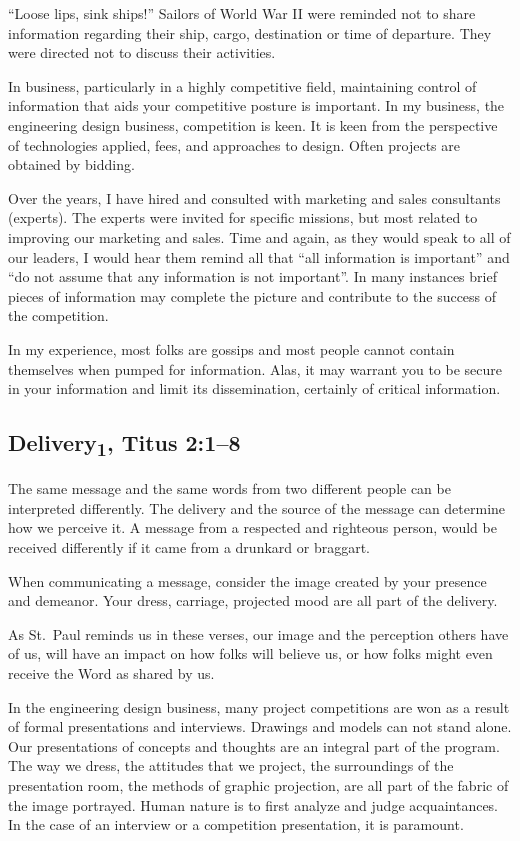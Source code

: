 \documentclass[12pt]{memoir}
\begin{document}
``Loose lips, sink ships!'' Sailors of World War II were reminded
not to share information regarding their ship, cargo, destination
or time of departure. They were directed not to discuss their activities.

In business, particularly in a highly competitive field, maintaining
control of information that aids your competitive posture is important.
In my business, the engineering design business, competition is keen.
It is keen from the perspective of technologies applied, fees, and
approaches to design. Often projects are obtained by bidding.

Over the years, I have hired and consulted with marketing and sales
consultants (experts). The experts were invited for specific missions,
but most related to improving our marketing and sales. Time
and again, as they would speak to all of our leaders, I would hear
them remind all that ``all information is important'' and ``do not assume that any information is not important''. In many instances
brief pieces of information may complete the picture and contribute
to the success of the competition.

In my experience, most folks are gossips and most people cannot contain themselves when pumped for information. Alas, it may warrant you to be secure in your information and limit its dissemination, certainly of critical information.

\subsection[Delivery\textsubscript{1}]{Delivery\textsubscript{1}, Titus 2:1--8}

The same message and the same words from two different people can
be interpreted differently. The delivery and the source of the message
can determine how we perceive it. A message from a respected and righteous
person, would be received differently if it came from a drunkard or
braggart.

When communicating a message, consider the image created by your presence and demeanor. Your dress, carriage, projected mood are all part of the delivery.

As St.~Paul reminds us in these verses, our image and the perception
others have of us, will have an impact on how folks will believe
us, or how folks might even receive the Word as shared by us.

In the engineering design business, many project competitions are
won as a result of formal presentations and interviews. Drawings
and models can not stand alone. Our presentations of concepts and
thoughts are an integral part of the program. The way we dress,
the attitudes that we project, the surroundings of the presentation
room, the methods of graphic projection, are all part of the fabric
of the image portrayed. Human nature is to first analyze and judge
acquaintances. In the case of an interview or a competition presentation,
it is paramount.
\end{document}
